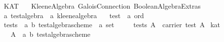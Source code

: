 %
\begin{isabellebody}%
\def\isabellecontext{KAT}%
%
\isadelimtheory
%
\endisadelimtheory
%
\isatagtheory
{}\isamarkupfalse%
\ KAT\isanewline
\ \ \ Kleene{}Algebra\ Galois{}Connection\ Boolean{}Algebra{}Extras\isanewline
{}%
\endisatagtheory
{\isafoldtheory}%
%
\isadelimtheory
\isanewline
%
\endisadelimtheory
\isanewline
{}\isamarkupfalse%
\ {}a\ test{}algebra\ {}\ {}{}a\ kleene{}algebra{}\ {}\isanewline
\ \ test\ {}{}\ {}{}a\ ord{}\isanewline
\isanewline
{}\isamarkupfalse%
\ tests\ {}{}\ {}{}{}a{}\ {}b{}\ test{}algebra{}scheme\ {}\ {}a\ set{}\ \isanewline
\ \ \ \ {}tests\ A\ {}\ carrier\ {}test\ A{}{}\isanewline
\isanewline
{}\isamarkupfalse%
\ kat{}\ {}\isanewline
\ \ \ A\ {}{}\ {}{}{}a{}\ {}b{}\ test{}algebra{}scheme{}\ {}\isanewline

\end{isabellebody}
